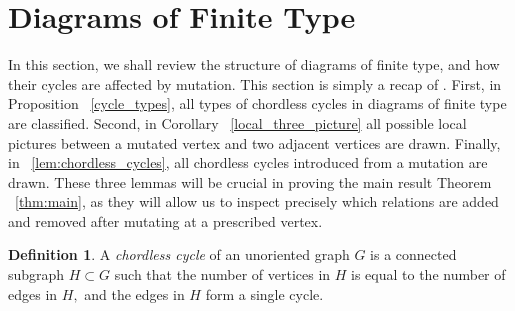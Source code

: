 \documentclass[11pt]{amsart}
\theoremstyle{definition}
\newtheorem{defn}[thm]{Definition}
\begin{document}
\section{Diagrams of Finite Type}
\label{sec:finite-type_diagrams}

In this section, we shall review the structure of diagrams of finite type, and how their cycles are affected by mutation. This section is simply a recap of \cite[Section 2]{BM13}. First, in Proposition ~\ref{cycle_types}, all types of chordless cycles in diagrams of finite type are classified. Second, in Corollary ~\ref{local_three_picture} all possible local pictures between a mutated vertex and two adjacent vertices are drawn. Finally, in ~\ref{lem:chordless_cycles}, all chordless cycles introduced from a mutation are drawn. These three lemmas will be crucial in proving the main result Theorem ~\ref{thm:main}, as they will allow us to inspect precisely which relations are added and removed after mutating at a prescribed vertex.

\begin{defn}
\label{chordlesscycle}
A {\it chordless cycle} of an unoriented graph $G$ is a connected subgraph $H \subset G$ such that the number of vertices in $H$ is equal to the number of edges in $H,$ and the edges in $H$ form a single cycle.
\end{defn}
\end{document}

